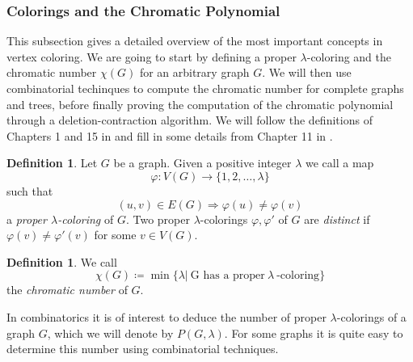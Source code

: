 \documentclass[12pt,a4paper, twoside, autooneside=false]{scrartcl}
\newtheorem{lemma}[theorem]{Lemma}
\theoremstyle{definition}
\newtheorem{definition}[theorem]{Definition}
\newtheorem{beispiel}[theorem]{Example}
\theoremstyle{remark}
\numberwithin{equation}{section}
\begin{document}
\subsubsection{Colorings and the Chromatic Polynomial}
This subsection gives a detailed overview of the most important concepts in vertex coloring. We are going to start by defining a proper $\lambda$-coloring and the chromatic number $\chi(G)$ for an arbitrary graph $G$. We will then use combinatorial techinques to compute the chromatic number for complete graphs and trees, before finally proving the computation of the chromatic polynomial through a deletion-contraction algorithm. We will follow the definitions of Chapters 1 and 15 in \cite{GoRo2001} and fill in some details from Chapter 11 in \cite{ElMo2022}.
\begin{definition}
Let $G$ be a graph. Given a positive integer $\lambda$ we call a map \[
\varphi: V(G) \to \{1, 2, \dots, \lambda\}
\] such that 
\[
(u,v) \in E(G) \Longrightarrow \varphi(u) \neq \varphi(v)
\]
a \textit{proper $\lambda$-coloring} of $G$. Two proper $\lambda$-colorings $\varphi, \varphi'$ of $G$ are \textit{distinct} if $\varphi(v) \neq \varphi'(v)$ for some $v \in V(G)$. 
\end{definition}
\begin{definition}
We call 
\[
\chi(G) \coloneqq \min\{\lambda |\  \text{G has a proper}\  \lambda \ \text{-coloring}\}
\]
the \textit{chromatic number} of $G$.
\end{definition}
In combinatorics it is of interest to deduce the number of proper $\lambda$-colorings of a graph $G$, which we will denote by $P(G,\lambda)$. For some graphs it is quite easy to determine this number using combinatorial techniques.
\end{document}
